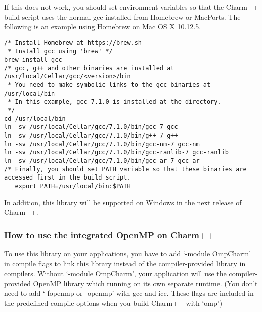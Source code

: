 If this does not work, you should set environment variables so that the Charm++ build script uses the
normal gcc installed from Homebrew or MacPorts. The following is an example using Homebrew on Mac OS X 10.12.5.

\begin{verbatim}
/* Install Homebrew at https://brew.sh
 * Install gcc using 'brew' */
brew install gcc
/* gcc, g++ and other binaries are installed at /usr/local/Cellar/gcc/<version>/bin
 * You need to make symbolic links to the gcc binaries at /usr/local/bin
 * In this example, gcc 7.1.0 is installed at the directory.
 */
cd /usr/local/bin
ln -sv /usr/local/Cellar/gcc/7.1.0/bin/gcc-7 gcc
ln -sv /usr/local/Cellar/gcc/7.1.0/bin/g++-7 g++
ln -sv /usr/local/Cellar/gcc/7.1.0/bin/gcc-nm-7 gcc-nm
ln -sv /usr/local/Cellar/gcc/7.1.0/bin/gcc-ranlib-7 gcc-ranlib
ln -sv /usr/local/Cellar/gcc/7.1.0/bin/gcc-ar-7 gcc-ar
/* Finally, you should set PATH variable so that these binaries are accessed first in the build script.
   export PATH=/usr/local/bin:$PATH
\end{verbatim}

In addition, this library will be supported on Windows in the next release of Charm++.

\subsubsection{How to use the integrated OpenMP on Charm++}

To use this library on your applications, you have to add `-module OmpCharm' in compile flags 
to link this library instead of the compiler-provided library in compilers. Without `-module OmpCharm', 
your application will use the compiler-provided OpenMP library which running on its own separate runtime. 
(You don't need to add `-fopenmp or -openmp' with gcc and icc. These flags are included 
in the predefined compile options when you build Charm++ with `omp')

